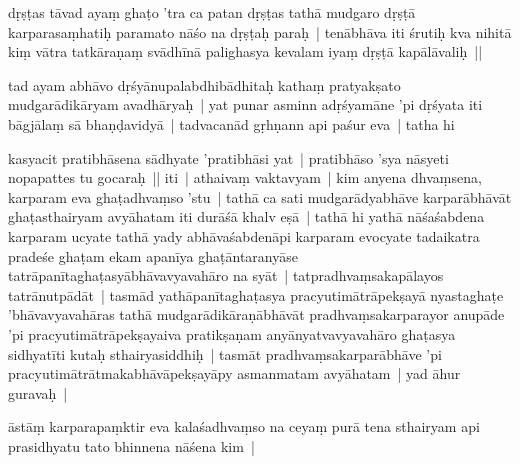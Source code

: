 \documentclass[article,12pt,a4paper]{memoir}%
\newcounter{parCount}
\begin{document}
	{}
	\pend%
      

	  
	  \pstart \leavevmode%
	dṛṣṭas tāvad ayaṃ ghaṭo 'tra ca patan dṛṣṭas tathā mudgaro dṛṣṭā karparasaṃhatiḥ paramato nāśo na dṛṣṭaḥ paraḥ | tenābhāva iti śrutiḥ kva nihitā kiṃ vātra tatkāraṇaṃ svādhīnā palighasya kevalam iyaṃ dṛṣṭā kapālāvaliḥ || 
	{}
	\pend%
      

	  
	  \pstart \leavevmode%
	tad ayam abhāvo dṛśyānupalabdhibādhitaḥ kathaṃ pratyakṣato mudgarādikāryam avadhāryaḥ | \label{thakur75-118.29} yat punar asminn adṛśyamāne 'pi dṛśyata iti bāgjālaṃ sā bhaṇḍavidyā | tadvacanād gṛhṇann api paśur eva | tatha hi
	{}
	\pend%
      

	  
	  \pstart \leavevmode%
	kasyacit pratibhāsena sādhyate 'pratibhāsi yat | pratibhāso 'sya nāsyeti nopapattes tu gocaraḥ || iti | \label{thakur75-119.1} athaivaṃ vaktavyam | kim anyena dhvaṃsena, karparam eva ghaṭadhvaṃso 'stu | tathā ca sati mudgarādyabhāve karparābhāvāt ghaṭasthairyam avyāhatam iti \label{thakur75-119.2} durāśā khalv eṣā | tathā hi yathā nāśaśabdena karparam ucyate tathā yady abhāvaśabdenāpi karparam evocyate tadaikatra pradeśe ghaṭam ekam apanīya ghaṭāntaranyāse tatrāpanītaghaṭasyābhāvavyavahāro na syāt | tatpradhvaṃsakapālayos tatrānutpādāt | tasmād yathāpanītaghaṭasya pracyutimātrāpekṣayā nyastaghaṭe 'bhāvavyavahāras tathā mudgarādikāraṇābhāvāt pradhvaṃsakarparayor anupāde 'pi pracyutimātrāpekṣayaiva pratikṣaṇam anyānyatvavyavahāro ghaṭasya sidhyatīti kutaḥ sthairyasiddhiḥ | tasmāt pradhvaṃsakarparābhāve 'pi pracyutimātrātmakabhāvāpekṣayāpy asmanmatam avyāhatam | \label{thakur75-119.9} yad āhur guravaḥ |
	{}
	\pend%
      

	  
	  \pstart \leavevmode%
	āstāṃ karparapaṃktir eva kalaśadhvaṃso na ceyaṃ purā tena sthairyam api prasidhyatu tato bhinnena nāśena kim |
	{}
	\pend%
      
\end{document}
